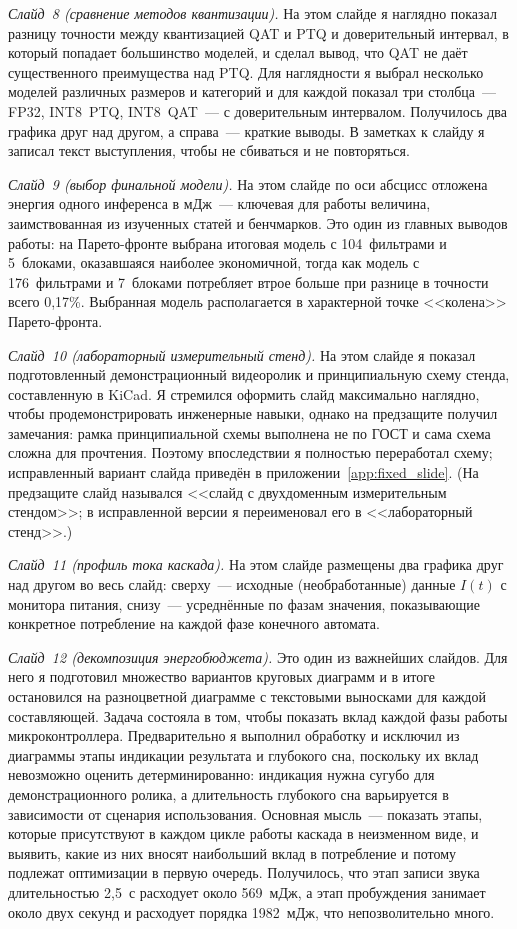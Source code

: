 \textit{Слайд~8 (сравнение методов квантизации).} На этом слайде я
наглядно показал разницу точности между квантизацией QAT и PTQ и
доверительный интервал, в который попадает большинство моделей, и сделал
вывод, что QAT не даёт существенного преимущества над PTQ. Для
наглядности я выбрал несколько моделей различных размеров и категорий и
для каждой показал три столбца~--- FP32, INT8~PTQ, INT8~QAT~--- с
доверительным интервалом. Получилось два графика друг над другом, а
справа~--- краткие выводы. В заметках к слайду я записал текст
выступления, чтобы не сбиваться и не повторяться.

\textit{Слайд~9 (выбор финальной модели).} На этом слайде по оси абсцисс
отложена энергия одного инференса в мДж~--- ключевая для работы величина,
заимствованная из изученных статей и бенчмарков. Это один из главных
выводов работы: на Парето-фронте выбрана итоговая модель с 104~фильтрами
и 5~блоками, оказавшаяся наиболее экономичной, тогда как модель с
176~фильтрами и 7~блоками потребляет втрое больше при разнице в точности
всего 0,17\%. Выбранная модель располагается в характерной точке
<<колена>> Парето-фронта.

\textit{Слайд~10 (лабораторный измерительный стенд).} На этом слайде я
показал подготовленный демонстрационный видеоролик и принципиальную схему
стенда, составленную в KiCad. Я стремился оформить слайд максимально
наглядно, чтобы продемонстрировать инженерные навыки, однако на
предзащите получил замечания: рамка принципиальной схемы выполнена не по
ГОСТ и сама схема сложна для прочтения. Поэтому впоследствии я полностью
переработал схему; исправленный вариант слайда приведён в
приложении~\ref{app:fixed_slide}. (На предзащите слайд назывался <<слайд
с двухдоменным измерительным стендом>>; в исправленной версии я
переименовал его в <<лабораторный стенд>>.)

\textit{Слайд~11 (профиль тока каскада).} На этом слайде размещены два
графика друг над другом во весь слайд: сверху~--- исходные (необработанные)
данные $I(t)$ с монитора питания, снизу~--- усреднённые по фазам значения,
показывающие конкретное потребление на каждой фазе конечного автомата.

\textit{Слайд~12 (декомпозиция энергобюджета).} Это один из важнейших
слайдов. Для него я подготовил множество вариантов круговых диаграмм и в
итоге остановился на разноцветной диаграмме с текстовыми выносками для
каждой составляющей. Задача состояла в том, чтобы показать вклад каждой
фазы работы микроконтроллера. Предварительно я выполнил обработку и
исключил из диаграммы этапы индикации результата и глубокого сна,
поскольку их вклад невозможно оценить детерминированно: индикация нужна
сугубо для демонстрационного ролика, а длительность глубокого сна
варьируется в зависимости от сценария использования. Основная мысль~---
показать этапы, которые присутствуют в каждом цикле работы каскада в
неизменном виде, и выявить, какие из них вносят наибольший вклад в
потребление и потому подлежат оптимизации в первую очередь. Получилось,
что этап записи звука длительностью 2,5~с расходует около 569~мДж, а этап
пробуждения занимает около двух секунд и расходует порядка 1982~мДж, что
непозволительно много.

